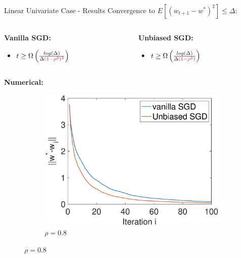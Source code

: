 \documentclass{beamer}
\begin{document}
\begin{frame}{Linear Univariate Case - Results}
    Convergence to $E[(w_{t+1}-w^*)^2]\leq\Delta$:\\
    \begin{columns}
        \begin{column}{0.483\textwidth}
            \newline 
            \textbf{Vanilla SGD:}
            \begin{itemize}
                \item  $t \geq \Omega\left(\frac{log(\Delta)}{\Delta \textcolor{red}{(1-\rho^2)^2}}\right) $
            \end{itemize}
        \end{column}
        \begin{column}{0.483\textwidth}
            \newline 
            \textbf{Unbiased SGD:}
            \begin{itemize}
                \item $t \geq \Omega\left(\frac{log(\Delta)}{\Delta\textcolor{red}{ (1-\rho^2)}}\right)$
            \end{itemize}
        \end{column}
    \end{columns}
    \textbf{Numerical:}
    \begin{figure}[h]
    \centering
    \begin{subfigure}{0.45\textwidth}
        \centering
        \includegraphics[width=\textwidth]{AR1_rho08.eps}
        \caption{$\rho=0.8$}
        \label{fig:image1}
    \end{subfigure}

\end{figure}
\end{frame}
\end{document}

